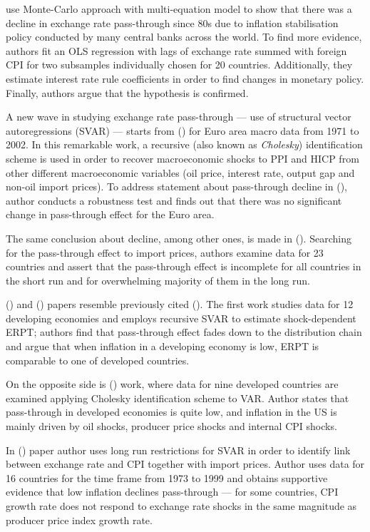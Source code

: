 \documentclass[12pt, a4paper]{extarticle}
\begin{document}
\textcite{Gagnon2004} use Monte-Carlo approach with multi-equation model to show that there was a decline in exchange rate pass-through since 80s due to inflation stabilisation policy conducted by many central banks across the world. To find more evidence, authors fit an OLS regression with lags of exchange rate summed with foreign CPI for two subsamples individually chosen for 20 countries. Additionally, they estimate interest rate rule coefficients in order to find changes in monetary policy. Finally, authors argue that the hypothesis is confirmed.

A new wave in studying exchange rate pass-through --- use of structural vector autoregressions (SVAR) --- starts from (\cite{Hahn2003}) for Euro area macro data from 1971 to 2002. In this remarkable work, a recursive (also known as \textit{Cholesky}) identification scheme is used in order to recover macroeconomic shocks to PPI and HICP from other different macroeconomic variables (oil price, interest rate, output gap and non-oil import prices). To address statement about pass-through decline in (\cite{Gagnon2004}), author conducts a robustness test and finds out that there was no significant change in pass-through effect for the Euro area.

The same conclusion about decline, among other ones, is made in (\cite{Campa2005}). Searching for the pass-through effect to import prices, authors examine data for 23 countries and assert that the pass-through effect is incomplete for all countries in the short run and for overwhelming majority of them in the long run.

(\cite{CaZorzi2007}) and (\cite{McCarthy2007}) papers resemble previously cited (\cite{Hahn2003}). The first work studies data for 12 developing economies and employs recursive SVAR to estimate shock-dependent ERPT; authors find that pass-through effect fades down to the distribution chain and argue that when inflation in a developing economy is low, ERPT is comparable to one of developed countries.

On the opposite side is (\cite{McCarthy2007}) work, where data for nine developed countries are examined applying Cholesky identification scheme to VAR. Author states that pass-through in developed economies is quite low, and inflation in the US is mainly driven by oil shocks, producer price shocks and internal CPI shocks.

In (\cite{Shambaugh2008}) paper author uses long run restrictions for SVAR in order to identify link between exchange rate and CPI together with import prices. Author uses data for 16 countries for the time frame from 1973 to 1999 and obtains supportive evidence that low inflation declines pass-through --- for some countries, CPI growth rate does not respond to exchange rate shocks in the same magnitude as producer price index growth rate.
\end{document}
